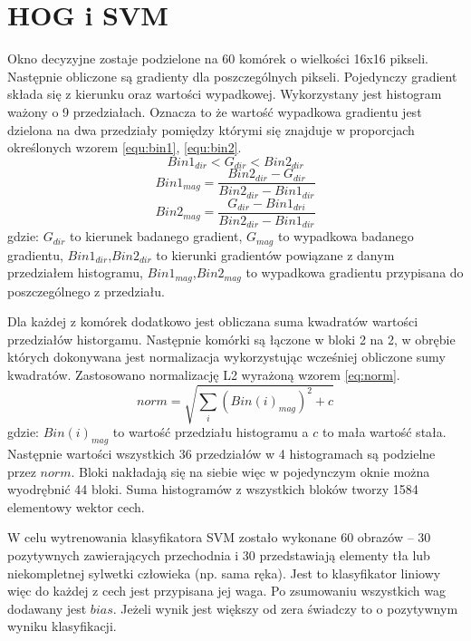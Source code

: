 \section{HOG i SVM}
Okno decyzyjne zostaje podzielone na 60 komórek o wielkości 16x16 pikseli. 
Następnie obliczone są gradienty dla poszczególnych pikseli. Pojedynczy gradient składa się z kierunku oraz wartości wypadkowej. Wykorzystany jest histogram ważony o 9 przedziałach. Oznacza to że wartość wypadkowa gradientu jest dzielona na dwa przedziały pomiędzy którymi się znajduje w proporcjach określonych wzorem \eqref{equ:bin1},  \eqref{equ:bin2}. 
\begin{equation}\label{equ:bin0}
Bin1_{dir} < G_{dir} < Bin2_{dir}
\end{equation}
\begin{equation}\label{equ:bin1}
Bin1_{mag} = \frac{Bin2_{dir} - G_{dir}}{Bin2_{dir} - Bin1_{dir}}
\end{equation}
\begin{equation}\label{equ:bin2}
Bin2_{mag} = \frac{G_{dir}- Bin1_{dri}}{Bin2_{dir} - Bin1_{dir}} 
\end{equation}
\noindent gdzie: $G_{dir}$ to kierunek badanego gradient, $G_{mag}$ to wypadkowa badanego gradientu, $Bin1_{dir}$,$Bin2_{dir}$ to kierunki gradientów powiązane z danym przedziałem histogramu, $Bin1_{mag}$,$Bin2_{mag}$ to wypadkowa gradientu przypisana do poszczególnego z przedziału.

Dla każdej z komórek dodatkowo jest obliczana suma kwadratów wartości przedziałów historgamu.
Następnie komórki są łączone w bloki 2 na 2, w obrębie których dokonywana jest normalizacja wykorzystując wcześniej obliczone sumy kwadratów. Zastosowano normalizację L2 wyrażoną wzorem \eqref{eq:norm}.
\begin{equation}\label{eq:norm}
norm = \sqrt{\sum_{i} (Bin(i)_{mag})^2 + c}
\end{equation}
\noindent gdzie: $Bin(i)_{mag}$ to wartość przedziału histogramu a $c$ to mała wartość stała.
Następnie wartości wszystkich 36 przedziałów w 4 histogramach są podzielne przez $norm$.
Bloki nakładają się na siebie więc w pojedynczym oknie można wyodrębnić 44 bloki. %
Suma histogramów z wszystkich bloków tworzy 1584 elementowy wektor cech. 

W celu wytrenowania klasyfikatora SVM zostało wykonane 60 obrazów – 30 pozytywnych zawierających przechodnia i 30 przedstawiają elementy tła lub niekompletnej sylwetki człowieka (np. sama ręka). 
Jest to klasyfikator liniowy więc do każdej z cech jest przypisana jej waga. Po zsumowaniu wszystkich wag dodawany jest $bias$. Jeżeli wynik jest większy od zera świadczy to o pozytywnym wyniku klasyfikacji. 

